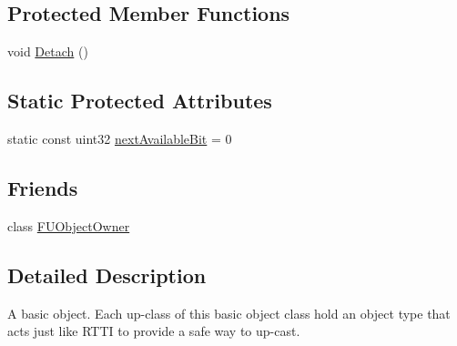 \subsection*{Protected Member Functions}
\begin{DoxyCompactItemize}
\item 
void \hyperlink{classFUObject_a9cd036c408a27037f59ac80c5c158ea5}{Detach} ()
\end{DoxyCompactItemize}
\subsection*{Static Protected Attributes}
\begin{DoxyCompactItemize}
\item 
static const uint32 \hyperlink{classFUObject_a1fe08ae8277bc677dc3339fcc4c03252}{nextAvailableBit} = 0
\end{DoxyCompactItemize}
\subsection*{Friends}
\begin{DoxyCompactItemize}
\item 
\hypertarget{classFUObject_a1fed355493a063bf080873e161f105be}{
class \hyperlink{classFUObject_a1fed355493a063bf080873e161f105be}{FUObjectOwner}}
\label{classFUObject_a1fed355493a063bf080873e161f105be}

\end{DoxyCompactItemize}


\subsection{Detailed Description}
A basic object. Each up-\/class of this basic object class hold an object type that acts just like RTTI to provide a safe way to up-\/cast. 

